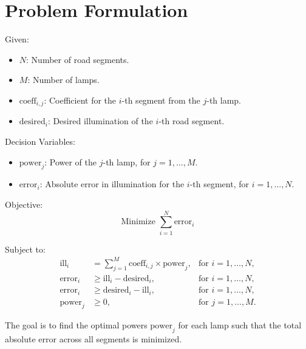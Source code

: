 \documentclass{article}
\begin{document}
\section*{Problem Formulation}

Given:
\begin{itemize}
    \item $N$: Number of road segments.
    \item $M$: Number of lamps.
    \item $\text{coeff}_{i,j}$: Coefficient for the $i$-th segment from the $j$-th lamp.
    \item $\text{desired}_i$: Desired illumination of the $i$-th road segment.
\end{itemize}

Decision Variables:
\begin{itemize}
    \item $\text{power}_j$: Power of the $j$-th lamp, for $j = 1, \ldots, M$.
    \item $\text{error}_i$: Absolute error in illumination for the $i$-th segment, for $i = 1, \ldots, N$.
\end{itemize}

Objective:
\[
\text{Minimize } \sum_{i=1}^{N} \text{error}_i
\]

Subject to:
\begin{align*}
    \text{ill}_i &= \sum_{j=1}^{M} \text{coeff}_{i,j} \times \text{power}_j, & \text{for } i = 1, \ldots, N, \\
    \text{error}_i &\geq \text{ill}_i - \text{desired}_i, & \text{for } i = 1, \ldots, N, \\
    \text{error}_i &\geq \text{desired}_i - \text{ill}_i, & \text{for } i = 1, \ldots, N, \\
    \text{power}_j &\geq 0, & \text{for } j = 1, \ldots, M.
\end{align*}

The goal is to find the optimal powers $\text{power}_j$ for each lamp such that the total absolute error across all segments is minimized.
\end{document}
